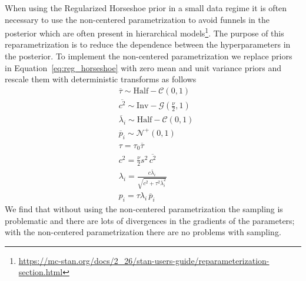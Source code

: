 \documentclass[modern]{aastex62}
\begin{document}
When using the Regularized Horseshoe prior in a small data regime it is often necessary to use the non-centered parametrization to avoid funnels in the posterior which are often present in hierarchical models\footnote{\url{https://mc-stan.org/docs/2_26/stan-users-guide/reparameterization-section.html}}.
The purpose of this reparametrization is to reduce the dependence between the hyperparameters in the posterior.
To implement the non-centered parametrization we replace priors in Equation~\ref{eq:reg_horseshoe} with zero mean and unit variance priors and rescale them with deterministic transforms as follows
\begin{equation}
\begin{aligned}
    &\overline{\tau} \sim \mathrm{Half}-\mathcal{C}\left(0, 1\right)\\
    &\overline{c^{2}}  \sim \mathrm{Inv}-\mathcal{G}\left(\frac{\nu}{2}, 1\right) \\
    &\overline{\lambda}_{i}  \sim \mathrm{Half}-\mathcal{C}(0,1) \\
    &\overline{p}_{i}  \sim \mathcal{N}^+\left(0, 1\right)\\
    &\tau=\tau_0\overline{\tau}\\
    &c^2=\frac{\nu}{2}s^2\,\overline{c^2}\\
    &\lambda_{i} =\frac{c \overline{\lambda}_{i}}{\sqrt{c^{2}+\tau^{2} \overline{\lambda}_{i}^{2}}} \\
    &p_i = \tau\lambda_i\,\overline{p}_i
\end{aligned}
    \label{eq:reg_horseshoe_noncentered}
\end{equation}
We find that without using the non-centered parametrization the sampling is problematic and there are lots of divergences in the gradients of the parameters; with the non-centered parametrization there are no problems with sampling.

\clearpage
\end{document}
